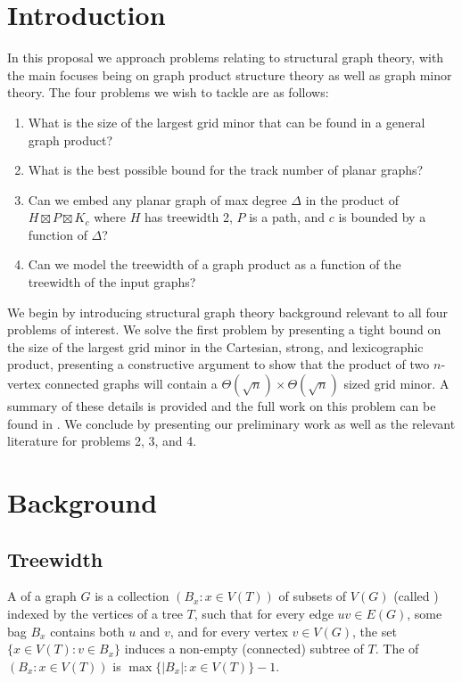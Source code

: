 \documentclass[../main.tex]{subfiles}
\begin{document}
\section{Introduction}
In this proposal we approach problems relating to structural graph theory, with the main focuses being on graph product structure theory as well as graph minor theory. The four problems we wish to tackle are as follows:
\begin{enumerate}
	\item What is the size of the largest grid minor that can be found in a general graph product?
	\item What is the best possible bound for the track number of planar graphs?
	\item Can we embed any planar graph of max degree $\Delta$ in the product of $H\boxtimes P\boxtimes K_c$ where $H$ has treewidth 2, $P$ is a path, and $c$ is bounded by a function of $\Delta$?
	\item Can we model the treewidth of a graph product as a function of the treewidth of the input graphs?
\end{enumerate}
We begin by introducing structural graph theory background relevant to all four problems of interest. We solve the first problem by presenting a tight bound on the size of the largest grid minor in the Cartesian, strong, and lexicographic product, presenting a constructive argument to show that the product of two $n$-vertex connected graphs will contain a $\Theta(\sqrt{n})\times\Theta(\sqrt{n})$ sized grid minor. A summary of these details is provided and the full work on this problem can be found in \cite{DMWW24}. We conclude by presenting our preliminary work as well as the relevant literature for problems 2, 3, and 4.

\section{Background}

\subsection{Treewidth}
A  of a graph $G$ is a collection $(B_x :x\in V(T))$ of subsets of $V(G)$ (called ) indexed by the vertices of a tree $T$, such that for every edge $uv\in E(G)$, some bag $B_x$ contains both $u$ and $v$, and for every vertex $v\in V(G)$, the set $\{x\in V(T):v\in B_x\}$ induces a non-empty (connected) subtree of $T$. The  of $(B_x:x\in V(T))$ is $\max\{|B_x| \colon x\in V(T)\}-1$. 
\end{document}
